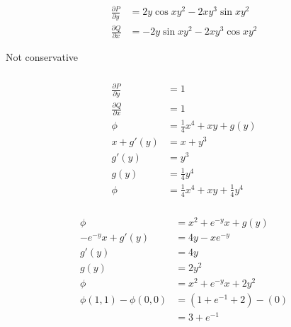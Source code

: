 \documentclass{article}
\begin{document}
\setcounter{subsubsection}{12}
\subsubsection{}

\begin{align*}
  \frac{\partial P}{\partial y} & = 2 y \cos x y^2 - 2 x y^3 \sin x y^2  \\
  \frac{\partial Q}{\partial x} & = -2 y \sin x y^2 - 2 x y^3 \cos x y^2
\end{align*}

Not conservative

\setcounter{subsubsection}{14}
\subsubsection{}

\begin{align*}
  \frac{\partial P}{\partial y} & = 1                                       \\
  \frac{\partial Q}{\partial x} & = 1                                       \\
  \phi                          & = \frac{1}{4} x^4 + x y + g(y)            \\
  x + g'(y)                     & = x + y^3                                 \\
  g'(y)                         & = y^3                                     \\
  g(y)                          & = \frac{1}{4} y^4                         \\
  \phi                          & = \frac{1}{4} x^4 + x y + \frac{1}{4} y^4
\end{align*}

\setcounter{subsubsection}{16}
\subsubsection{}

\begin{align*}
  \phi                    & = x^2 + e^{-y} x + g(y)  \\
  -e^{-y} x + g'(y)       & = 4 y - x e^{-y}         \\
  g'(y)                   & = 4 y                    \\
  g(y)                    & = 2 y^2                  \\
  \phi                    & = x^2 + e^{-y} x + 2 y^2 \\
  \phi(1, 1) - \phi(0, 0) & = (1 + e^{-1} + 2) - (0) \\
                          & = 3 + e^{-1}
\end{align*}
\end{document}
